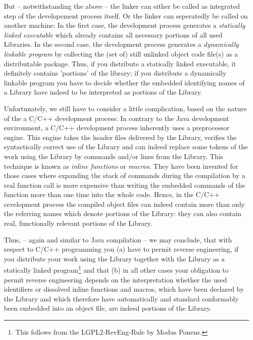 But -- notwithstanding the above -- the linker can either be called as
integrated step of the developement process itself. Or the linker can
seperatedly be called on another machine: In the first case, the development
process generates a \emph{statically linked executable} which already contains
all necessary portions of all used Libraries. In the second case, the
development process generates a \emph{dynamically linkable program} by
collecting the (set of) still unlinked object code file(s) as a distributable
package. Thus, if you distribute a statically linked executable, it definitely
contains 'portions' of the library; if you distribute a dynamically linkable
program you have to decide whether the embedded identifying names of a Library
have indeed to be interpreted as portions of the Library.

Unfortunately, we still have to consider a little complication, based on the
nature of the a C/C++ development process: In contrary to the Java development
environment, a C/C++ development process inherently uses a preprocessor engine.
This engine takes the header files delivered by the Library, verifies the
syntactically correct use of the Library and can indeed replace some tokens of
the work using the Library by commands and/or lines from the Library. This
technique is known as \emph{inline functions} or \emph{macros}. They have been
invented for those cases where expanding the stack of commands during the
compilation by a real function call is more expensive than writing the embedded
commands of the function more than one time into the whole code. Hence, in the
C/C++ cevelopment process the compiled object files can indeed contain more than
only the referring names which denote portions of the Library: they can also
contain real, functionally relevant portions of the Library.
 
Thus, -- again and similar to Java compilation -- we may conclude, that with
respect to C/C++ programming you (a) have to permit reverse engineering, if you
distribute your work using the Library together with the Library as a statically
linked program\footnote{This follows from the LGPL2-RevEng-Rule by Modus
Ponens.} and that (b) in all other cases your obligation to permit reverse
engineering depends on the interpretation whether the used identifiers or
dissolved inline functions and macros, which have been declared by the Library
and which therefore have automatically and standard conformably been embedded
into an object file, are indeed portions of the Library.

